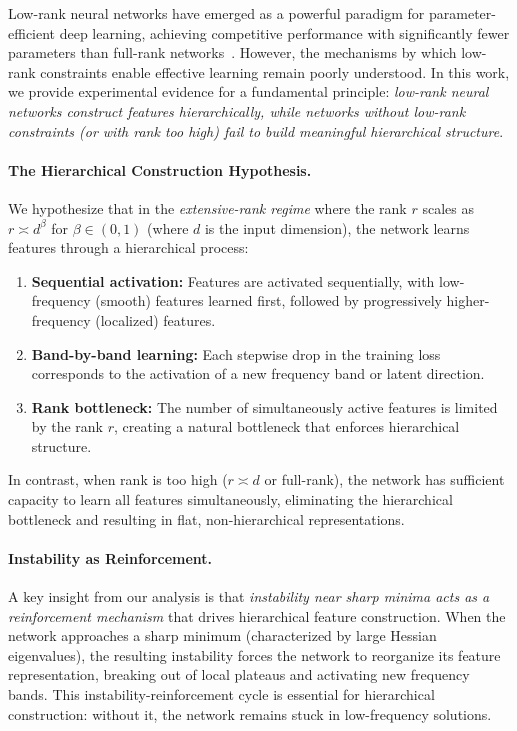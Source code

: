Low-rank neural networks have emerged as a powerful paradigm for parameter-efficient deep learning, achieving competitive performance with significantly fewer parameters than full-rank networks~\cite{arora2018optimization,novikov2015tensorizing}. However, the mechanisms by which low-rank constraints enable effective learning remain poorly understood. In this work, we provide experimental evidence for a fundamental principle: \emph{low-rank neural networks construct features hierarchically, while networks without low-rank constraints (or with rank too high) fail to build meaningful hierarchical structure}.

\paragraph{The Hierarchical Construction Hypothesis.}
We hypothesize that in the \emph{extensive-rank regime} where the rank $r$ scales as $r \asymp d^\beta$ for $\beta \in (0,1)$ (where $d$ is the input dimension), the network learns features through a hierarchical process:
\begin{enumerate}
    \item \textbf{Sequential activation:} Features are activated sequentially, with low-frequency (smooth) features learned first, followed by progressively higher-frequency (localized) features.
    \item \textbf{Band-by-band learning:} Each stepwise drop in the training loss corresponds to the activation of a new frequency band or latent direction.
    \item \textbf{Rank bottleneck:} The number of simultaneously active features is limited by the rank $r$, creating a natural bottleneck that enforces hierarchical structure.
\end{enumerate}

In contrast, when rank is too high ($r \asymp d$ or full-rank), the network has sufficient capacity to learn all features simultaneously, eliminating the hierarchical bottleneck and resulting in flat, non-hierarchical representations.

\paragraph{Instability as Reinforcement.}
A key insight from our analysis is that \emph{instability near sharp minima acts as a reinforcement mechanism} that drives hierarchical feature construction. When the network approaches a sharp minimum (characterized by large Hessian eigenvalues), the resulting instability forces the network to reorganize its feature representation, breaking out of local plateaus and activating new frequency bands. This instability-reinforcement cycle is essential for hierarchical construction: without it, the network remains stuck in low-frequency solutions.

